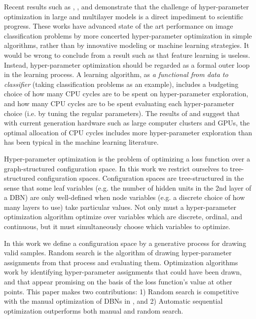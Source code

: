 \documentclass{article}
\renewcommand{\citet}{\cite}
\begin{document}
Recent results such as
\citet{Pinto-2009}, \citet{coates+lee+ng:2010}, and \citet{coates+ng:2011}
demonstrate that the challenge of hyper-parameter optimization
in large and multilayer models is a direct impediment to scientific progress.
These works
have advanced state of the art performance on image classification problems
by more concerted hyper-parameter optimization in simple algorithms,
rather than by innovative modeling or machine learning strategies.
It would be wrong to conclude from a result such as \citet{Pinto-2009}
that feature learning is useless.
Instead, hyper-parameter optimization should be regarded as
a formal outer loop in the learning process.
A learning algorithm,
as {\em a functional from data to classifier} (taking classification problems as an example),
includes a budgeting choice of how many CPU cycles are to be spent on hyper-parameter exploration,
and how many CPU cycles are to be spent evaluating each hyper-parameter choice (i.e. by
tuning the regular parameters).
The results of \citet{Pinto-2009} and \citet{coates+ng:2011} suggest that
with current generation hardware such as large computer clusters and GPUs,
the optimal allocation of CPU cycles includes more hyper-parameter exploration
than has been typical in the machine learning literature.

Hyper-parameter optimization is the problem of optimizing a loss function
over a graph-structured configuration space.
In this work we restrict ourselves to tree-structured configuration spaces.
Configuration spaces are
tree-structured in the sense that some leaf variables (e.g. the number of
hidden units in the 2nd layer of a DBN) are only well-defined when node
variables (e.g. a discrete choice of how many layers to use) take
particular values. Not only must a hyper-parameter optimization algorithm
optimize over variables which are discrete, ordinal, and continuous, but
it must simultaneously choose which variables to optimize.

In this work we define a configuration space by a generative process for
drawing valid samples.  Random search is the algorithm of drawing
hyper-parameter assignments from that process and evaluating them.  Optimization algorithms
work by identifying hyper-parameter assignments that
could have been drawn, and that appear promising on the basis of the loss
function's value at other points.  This paper makes two contributions:
1) Random search is competitive with the manual optimization of DBNs in
\citet{Larochelle+etal:2007}, and 2) Automatic sequential optimization
outperforms both manual and random search.
\end{document}
